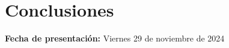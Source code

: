 \documentclass[../portafolio.tex]{subfiles}
\begin{document}
\chapter*{Conclusiones}

\hfill \textbf{Fecha de presentación:} Viernes 29 de noviembre de 2024

\medskip






\end{document}
